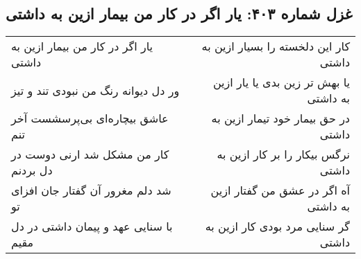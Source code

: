 \begin{center}
\section*{غزل شماره ۴۰۳: یار اگر در کار من بیمار ازین به داشتی}
\label{sec:403}
\begin{longtable}{l p{0.5cm} r}
یار اگر در کار من بیمار ازین به داشتی
&&
کار این دلخسته را بسیار ازین به داشتی
\\
ور دل دیوانه رنگ من نبودی تند و تیز
&&
یا بهش تر زین بدی یا یار ازین به داشتی
\\
عاشق بیچاره‌ای بی‌پرسشست آخر تنم
&&
در حق بیمار خود تیمار ازین به داشتی
\\
کار من مشکل شد ارنی دوست در دل بردنم
&&
نرگس بیکار را بر کار ازین به داشتی
\\
شد دلم مغرور آن گفتار جان افزای تو
&&
آه اگر در عشق من گفتار ازین به داشتی
\\
با سنایی عهد و پیمان داشتی در دل مقیم
&&
گر سنایی مرد بودی کار ازین به داشتی
\\
\end{longtable}
\end{center}
